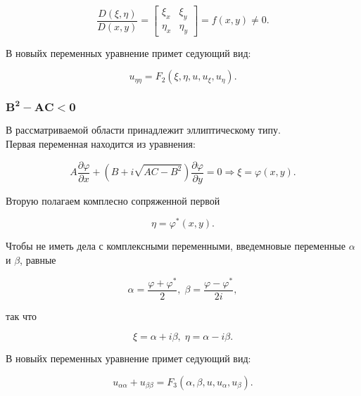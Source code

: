 			\begin{equation}
				\frac{D \left( \xi, \eta \right)}{D \left( x, y \right)} =
				\begin{bmatrix}
					\xi_{x} & \xi_{y}\\
					\eta_{x} & \eta_{y}
				\end{bmatrix} =
				f \left( x, y \right) \neq 0.
			\end{equation}

			В новыйх переменных уравнение примет седующий вид:
			
			\begin{equation}
				u_{\eta \eta} = F_{2} \left( \xi, \eta, u, u_{\xi}, u_{\eta} \right).
			\end{equation}

		\subsubsection*{$\mathbf{B^{2} - AC < 0}$}

			В рассматриваемой области принадлежит эллиптическому типу.\\

			Первая переменная находится из уравнения:

		    \begin{equation}
				A \frac{\partial \varphi}{\partial x} + \left( B + i \sqrt{A C - B^{2}} \right) \frac{\partial \varphi}{\partial y} = 0 \Rightarrow \xi = \varphi \left( x, y \right).
			\end{equation}

			Вторую полагаем комплесно сопряженной первой

			\begin{equation}
				\eta = \varphi^{*} \left( x, y \right).
			\end{equation}

			 Чтобы не иметь дела с комплексными переменными, введемновые переменные $\alpha$ и $\beta$, равные

			\begin{equation}
				\alpha = \frac{\varphi + \varphi^{*}}{2}, \; \beta = \frac{\varphi - \varphi^{*}}{2 i},
			\end{equation}

			так что

			\begin{equation}
				\xi = \alpha + i \beta, \; \eta = \alpha - i \beta.
			\end{equation}

			В новыйх переменных уравнение примет седующий вид:

			\begin{equation}
				u_{\alpha \alpha} + u_{\beta \beta} = F_{3} \left( \alpha, \beta, u, u_{\alpha}, u_{\beta} \right).
			\end{equation}

	\newpage
